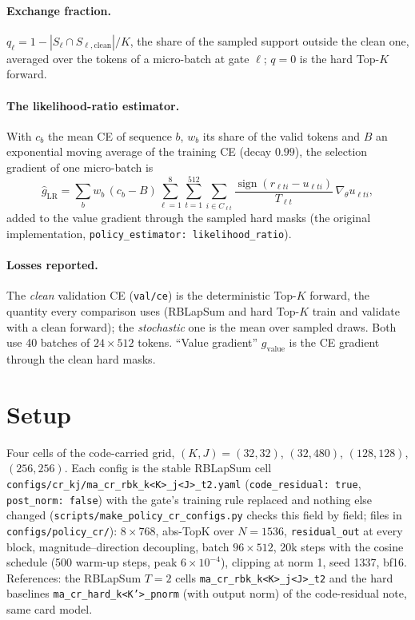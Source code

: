 \documentclass[11pt,a4paper]{article}
\newcommand{\code}[1]{\texttt{#1}}
\newcommand{\sgn}{\operatorname{sign}}
\begin{document}
\paragraph{Exchange fraction.}
$q_\ell = 1 - |S_\ell \cap S_{\ell,\mathrm{clean}}| / K$, the share of the
sampled support outside the clean one, averaged over the tokens of a
micro-batch at gate $\ell$; $q = 0$ is the hard Top-$K$ forward.

\paragraph{The likelihood-ratio estimator.}
With $c_b$ the mean CE of sequence $b$, $w_b$ its share of the valid tokens and
$B$ an exponential moving average of the training CE (decay $0.99$), the
selection gradient of one micro-batch is
\begin{equation}
\hat g_{\mathrm{LR}} = \sum_b w_b\,(c_b - B) \sum_{\ell=1}^{8} \sum_{t=1}^{512}
\sum_{i \in C_{\ell t}} \frac{\sgn(r_{\ell t i} - u_{\ell t i})}{T_{\ell t}}\,
\nabla_\theta u_{\ell t i},
\label{eq:lr}
\end{equation}
added to the value gradient through the sampled hard masks (the original
implementation, \code{policy\_estimator: likelihood\_ratio}).

\paragraph{Losses reported.}
The \emph{clean} validation CE (\code{val/ce}) is the deterministic Top-$K$
forward, the quantity every comparison uses (RBLapSum and hard Top-$K$ train and
validate with a clean forward); the \emph{stochastic} one is the mean over
sampled draws. Both use 40 batches of $24 \times 512$ tokens. ``Value gradient''
$g_{\mathrm{value}}$ is the CE gradient through the clean hard masks.

\section{Setup}

Four cells of the code-carried grid, $(K, J) = (32, 32)$, $(32, 480)$,
$(128, 128)$, $(256, 256)$. Each config is the stable RBLapSum cell
\code{configs/cr\_kj/ma\_cr\_rbk\_k<K>\_j<J>\_t2.yaml} (\code{code\_residual: true},
\code{post\_norm: false}) with the gate's training rule replaced and nothing
else changed (\code{scripts/make\_policy\_cr\_configs.py} checks this field by
field; files in \code{configs/policy\_cr/}): $8 \times 768$, abs-TopK over
$N = 1536$, \code{residual\_out} at every block, magnitude--direction
decoupling, batch $96 \times 512$, 20k steps with the cosine schedule (500
warm-up steps, peak $6 \times 10^{-4}$), clipping at norm 1, seed 1337, bf16.
References: the RBLapSum $T=2$ cells \code{ma\_cr\_rbk\_k<K>\_j<J>\_t2} and the
hard baselines \code{ma\_cr\_hard\_k<K'>\_pnorm} (with output norm) of the
code-residual note, same card model.
\end{document}
